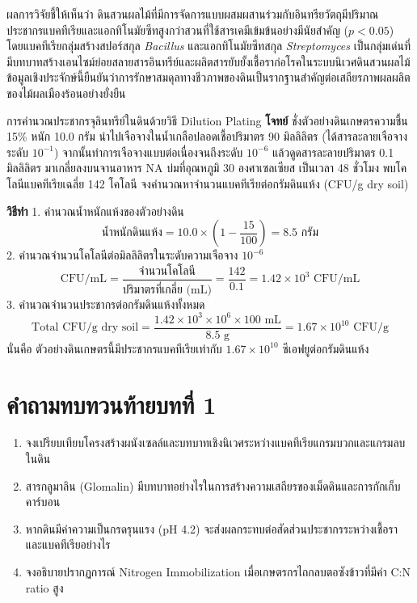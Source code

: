 ผลการวิจัยชี้ให้เห็นว่า ดินสวนผลไม้ที่มีการจัดการแบบผสมผสานร่วมกับอินทรียวัตถุมีปริมาณประชากรแบคทีเรียและแอกทิโนมัยซีทสูงกว่าสวนที่ใช้สารเคมีเข้มข้นอย่างมีนัยสำคัญ ($p < 0.05$) โดยแบคทีเรียกลุ่มสร้างสปอร์สกุล \textit{Bacillus} และแอกทิโนมัยซีทสกุล \textit{Streptomyces} เป็นกลุ่มเด่นที่มีบทบาทสร้างเอนไซม์ย่อยสลายสารอินทรีย์และผลิตสารยับยั้งเชื้อราก่อโรคในระบบนิเวศดินสวนผลไม้ ข้อมูลเชิงประจักษ์นี้ยืนยันว่าการรักษาสมดุลทางชีวภาพของดินเป็นรากฐานสำคัญต่อเสถียรภาพผลผลิตของไม้ผลเมืองร้อนอย่างยั่งยืน

\begin{worked}{การคำนวณประชากรจุลินทรีย์ในดินด้วยวิธี Dilution Plating}
\textbf{โจทย์} ชั่งตัวอย่างดินเกษตรความชื้น 15\% หนัก 10.0 กรัม นำไปเจือจางในน้ำเกลือปลอดเชื้อปริมาตร 90 มิลลิลิตร (ได้สารละลายเจือจางระดับ $10^{-1}$) จากนั้นทำการเจือจางแบบต่อเนื่องจนถึงระดับ $10^{-6}$ แล้วดูดสารละลายปริมาตร 0.1 มิลลิลิตร มาเกลี่ยลงบนจานอาหาร NA บ่มที่อุณหภูมิ 30 องศาเซลเซียส เป็นเวลา 48 ชั่วโมง พบโคโลนีแบคทีเรียเฉลี่ย 142 โคโลนี จงคำนวณหาจำนวนแบคทีเรียต่อกรัมดินแห้ง (CFU/g dry soil)

\textbf{วิธีทำ}
1. คำนวณน้ำหนักแห้งของตัวอย่างดิน
\begin{equation}
\text{น้ำหนักดินแห้ง} = 10.0 \times \left(1 - \frac{15}{100}\right) = 8.5 \text{ กรัม}
\end{equation}
2. คำนวณจำนวนโคโลนีต่อมิลลิลิตรในระดับความเจือจาง $10^{-6}$
\begin{equation}
\text{CFU/mL} = \frac{\text{จำนวนโคโลนี}}{\text{ปริมาตรที่เกลี่ย (mL)}} = \frac{142}{0.1} = 1.42 \times 10^3 \text{ CFU/mL}
\end{equation}
3. คำนวณจำนวนประชากรต่อกรัมดินแห้งทั้งหมด
\begin{equation}
\text{Total CFU/g dry soil} = \frac{1.42 \times 10^3 \times 10^6 \times 100 \text{ mL}}{8.5 \text{ g}} = 1.67 \times 10^{10} \text{ CFU/g}
\end{equation}
นั่นคือ ตัวอย่างดินเกษตรนี้มีประชากรแบคทีเรียเท่ากับ $1.67 \times 10^{10}$ ซีเอฟยูต่อกรัมดินแห้ง
\end{worked}

\section*{คำถามทบทวนท้ายบทที่ 1}
\begin{enumerate}
    \item จงเปรียบเทียบโครงสร้างผนังเซลล์และบทบาทเชิงนิเวศระหว่างแบคทีเรียแกรมบวกและแกรมลบในดิน
    \item สารกลูมาลิน (Glomalin) มีบทบาทอย่างไรในการสร้างความเสถียรของเม็ดดินและการกักเก็บคาร์บอน
    \item หากดินมีค่าความเป็นกรดรุนแรง (pH 4.2) จะส่งผลกระทบต่อสัดส่วนประชากรระหว่างเชื้อราและแบคทีเรียอย่างไร
    \item จงอธิบายปรากฏการณ์ Nitrogen Immobilization เมื่อเกษตรกรไถกลบตอซังข้าวที่มีค่า C:N ratio สูง
\end{enumerate}

\clearpage
